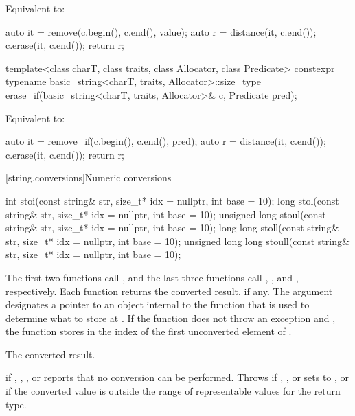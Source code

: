 \begin{itemdescr}
\pnum
\effects
Equivalent to:
\begin{codeblock}
auto it = remove(c.begin(), c.end(), value);
auto r = distance(it, c.end());
c.erase(it, c.end());
return r;
\end{codeblock}
\end{itemdescr}

%
\begin{itemdecl}
template<class charT, class traits, class Allocator, class Predicate>
  constexpr typename basic_string<charT, traits, Allocator>::size_type
    erase_if(basic_string<charT, traits, Allocator>& c, Predicate pred);
\end{itemdecl}

\begin{itemdescr}
\pnum
\effects
Equivalent to:
\begin{codeblock}
auto it = remove_if(c.begin(), c.end(), pred);
auto r = distance(it, c.end());
c.erase(it, c.end());
return r;
\end{codeblock}
\end{itemdescr}

[string.conversions]{Numeric conversions}

%
%
%
%
%
\begin{itemdecl}
int stoi(const string& str, size_t* idx = nullptr, int base = 10);
long stol(const string& str, size_t* idx = nullptr, int base = 10);
unsigned long stoul(const string& str, size_t* idx = nullptr, int base = 10);
long long stoll(const string& str, size_t* idx = nullptr, int base = 10);
unsigned long long stoull(const string& str, size_t* idx = nullptr, int base = 10);
\end{itemdecl}

\begin{itemdescr}
\pnum
\effects
The first two functions call ,
and the last three functions call ,
, and , respectively. Each function returns the converted result, if any. The
argument  designates a pointer to an object internal to the function
that is used to determine what to store at . If the function does
not throw an exception and , the function stores in 
the index of the first unconverted element of .

\pnum
\returns
The converted result.

\pnum
\throws
{} if , ,
, or  reports that no conversion can be
performed. Throws  if , ,
 or  sets  to ,
or if the converted value is outside the range of representable values
for the return type.
\end{itemdescr}

